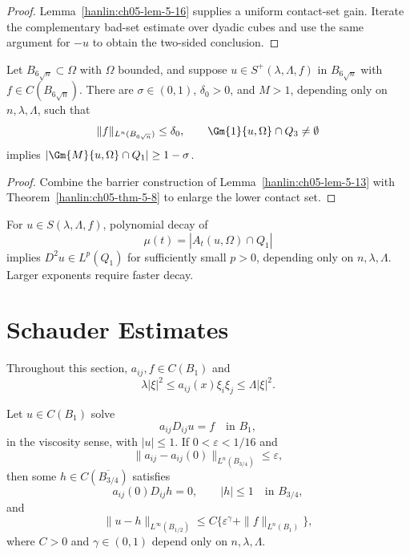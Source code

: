 \begin{proof}
\sketch Lemma~\ref{hanlin:ch05-lem-5-16} supplies a uniform contact-set
gain. Iterate the complementary bad-set estimate over dyadic cubes and use
the same argument for $-u$ to obtain the two-sided conclusion.
\end{proof}

\begin{lemma}\label{hanlin:ch05-lem-5-16}
Let $B_{6\sqrt n}\subset\Omega$ with $\Omega$ bounded, and suppose
$u\in S^+(\lambda,\Lambda,f)$ in $B_{6\sqrt n}$ with
$f\in C(B_{6\sqrt n})$. There are $\sigma\in(0,1)$, $\delta_0>0$,
and $M>1$, depending only on $n,\lambda,\Lambda$, such that
\[
\|f\|_{L^n(B_{6\sqrt n})}\leq\delta_0,\qquad
\Gm{1}{u,\Omega}\cap Q_3\neq\emptyset
\]
implies $|\Gm{M}{u,\Omega}\cap Q_1|\geq1-\sigma$.
\end{lemma}

\begin{proof}
\sketch Combine the barrier construction of
Lemma~\ref{hanlin:ch05-lem-5-13} with
Theorem~\ref{hanlin:ch05-thm-5-8} to enlarge the lower contact set.
\end{proof}


\begin{remark}\label{hanlin:ch05-rem-5-17}
For $u\in S(\lambda,\Lambda,f)$, polynomial decay of
\[
\mu(t)=|A_t(u,\Omega)\cap Q_1|
\]
implies $D^2u\in L^p(Q_1)$ for sufficiently small $p>0$, depending only
on $n,\lambda,\Lambda$. Larger exponents require faster decay.
\end{remark}

\section{Schauder Estimates}

Throughout this section, $a_{ij},f\in C(B_1)$ and
\[
\lambda|\xi|^2\leq a_{ij}(x)\xi_i\xi_j\leq\Lambda|\xi|^2.
\]

\begin{lemma}\label{hanlin:ch05-lem-5-18}
Let $u\in C(B_1)$ solve
\[
a_{ij}D_{ij}u=f\quad\text{in }B_1,
\]
in the viscosity sense, with $|u|\leq1$. If $0<\varepsilon<1/16$ and
\[
\|a_{ij}-a_{ij}(0)\|_{L^n(B_{3/4})}\leq\varepsilon,
\]
then some $h\in C(\overline{B_{3/4}})$ satisfies
\[
a_{ij}(0)D_{ij}h=0,\qquad |h|\leq1\quad\text{in }B_{3/4},
\]
and
\[
\|u-h\|_{L^\infty(B_{1/2})}\leq C\{\varepsilon^\gamma+\|f\|_{L^n(B_1)}\},
\]
where $C>0$ and $\gamma\in(0,1)$ depend only on $n,\lambda,\Lambda$.
\end{lemma}

